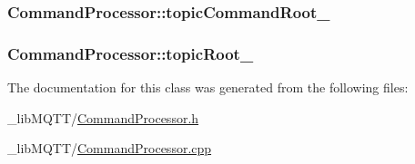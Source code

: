 \subsubsection[{\texorpdfstring{topic\+Command\+Root\+\_\+}{topicCommandRoot_}}]{ Command\+Processor\+::topic\+Command\+Root\+\_\+\hspace{0.3cm}{\ttfamily [protected]}}\hypertarget{class_command_processor_ac695d4ff50c2dd91b25c8079b22170e4}{}\label{class_command_processor_ac695d4ff50c2dd91b25c8079b22170e4}
\subsubsection[{\texorpdfstring{topic\+Root\+\_\+}{topicRoot_}}]{ Command\+Processor\+::topic\+Root\+\_\+\hspace{0.3cm}{\ttfamily [protected]}}\hypertarget{class_command_processor_a97f0d615c62c8c7e1712522c4577ea53}{}\label{class_command_processor_a97f0d615c62c8c7e1712522c4577ea53}


The documentation for this class was generated from the following files\+:\begin{DoxyCompactItemize}
\item 
\+\_\+lib\+M\+Q\+T\+T/\hyperlink{_command_processor_8h}{Command\+Processor.\+h}\item 
\+\_\+lib\+M\+Q\+T\+T/\hyperlink{_command_processor_8cpp}{Command\+Processor.\+cpp}\end{DoxyCompactItemize}
